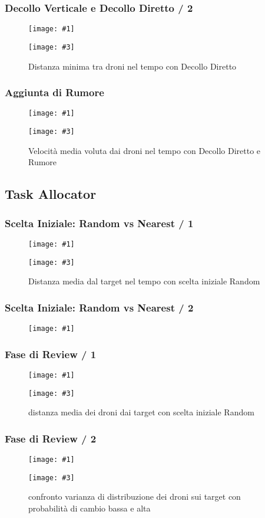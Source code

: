 \documentclass{beamer}
\newcommand{\putimage}[2] {
  \begin{figure}[H]
    \centering
    \texttt{[image: \#1]}
	\end{figure}
}
\newcommand{\putimagecouple}[4] {
  \begin{figure}[!htb]
    \centering
    \begin{minipage}{0.45\linewidth}
      \centering
      \texttt{[image: \#1]}
      \caption{#2}
    \end{minipage}
    \hspace{0.25cm}
    \begin{minipage}{0.45\linewidth}
      \centering
      \texttt{[image: \#3]}
      \caption{#4}
    \end{minipage}
  \end{figure}
}
\begin{document}
\begin{frame}
\frametitle{Decollo Verticale e Decollo Diretto / 2}
\putimagecouple{images/slides/task-executor-noiseless-vertical/MinDistancesGlobally.png}{Distanza minima tra droni nel tempo con Decollo Verticale}
               {images/slides/task-executor-noiseless-direct/MinDistancesGlobally.png}{Distanza minima tra droni nel tempo con Decollo Diretto}
\end{frame}

\begin{frame}
\frametitle{Aggiunta di Rumore}
\putimagecouple{images/slides/task-executor-noisy-vertical/MeanSpeed.png}{Velocit\`a media voluta dai droni nel tempo con Decollo Verticale e Rumore}
               {images/slides/task-executor-noisy-direct/MeanSpeed.png}{Velocit\`a media voluta dai droni nel tempo con Decollo Diretto e Rumore}
\end{frame}

\subsection{Task Allocator}

\begin{frame}
\frametitle{Scelta Iniziale: Random vs Nearest / 1}
\putimagecouple{images/slides/task-allocator-nearest/MeanDistanceFromTarget.png}{Distanza media dal target nel tempo con scelta iniziale Nearest}
               {images/slides/task-allocator-random/MeanDistanceFromTarget.png}{Distanza media dal target nel tempo con scelta iniziale Random}
\end{frame}

\begin{frame}
\frametitle{Scelta Iniziale: Random vs Nearest / 2}
\putimage{images/slides/task-allocator-no-review/MeanDistancesWithinSquadron.png}{0.66}
\end{frame}

\begin{frame}
\frametitle{Fase di Review / 1}
\putimagecouple{images/slides/task-allocator-nearest-shortened/MeanDistanceFromTarget.png}{distanza media dei droni dai target con scelta iniziale Nearest}
               {images/slides/task-allocator-random-shortened/MeanDistanceFromTarget.png}{distanza media dei droni dai target con scelta iniziale Random}
\end{frame}

\begin{frame}
\frametitle{Fase di Review / 2}
\putimagecouple{images/slides/task-allocator-random-shortened/VarTargetDensityOverTime.png}{varianza di distribuzione dei droni sui target con probabilit\`a di cambio bassa}
               {images/slides/task-allocator-random-always/VarTargetDensityOverTime.png}{confronto varianza di distribuzione dei droni sui target con probabilit\`a di cambio bassa e alta}
\end{frame}
\end{document}
